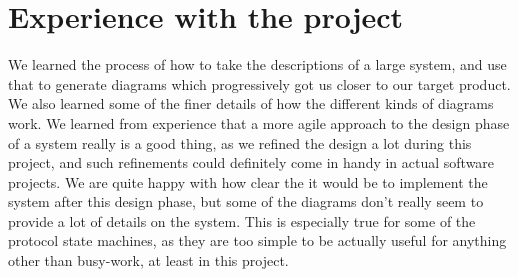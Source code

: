 \section{Experience with the project}
We learned the process of how to take the descriptions of a large system, and use that to generate diagrams which progressively got us closer to our target product. We also learned some of the finer details of how the different kinds of diagrams work. We learned from experience that a more agile approach to the design phase of a system really is a good thing, as we refined the design a lot during this project, and such refinements could definitely come in handy in actual software projects. We are quite happy with how clear the it would be to implement the system after this design phase, but some of the diagrams don't really seem to provide a lot of details on the system. This is especially true for some of the protocol state machines, as they are too simple to be actually useful for anything other than busy-work, at least in this project.


